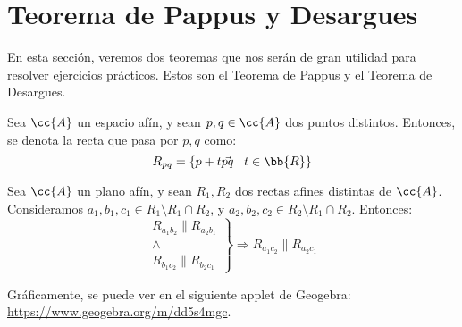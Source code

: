 \section{Teorema de Pappus y Desargues}
En esta sección, veremos dos teoremas que nos serán de gran utilidad para resolver ejercicios prácticos. Estos son el Teorema de Pappus y el Teorema de Desargues.

\begin{notacion}
    Sea $\cc{A}$ un espacio afín, y sean $p,q\in \cc{A}$ dos puntos distintos. Entonces, se denota la recta que pasa por $p,q$ como:
    \begin{equation*}
        R_{pq} = \{p+t\vec{pq}\mid t\in \bb{R}\}
    \end{equation*}
\end{notacion}
\begin{teo}[de Pappus]
    Sea $\cc{A}$ un plano afín, y sean $R_1, R_2$ dos rectas afines distintas de $\cc{A}$.
    Consideramos $a_1,b_1,c_1\in R_1\setminus R_1\cap R_2$, y $a_2,b_2,c_2\in R_2\setminus R_1\cap R_2$. Entonces:
    \begin{equation*}
        \left.
            \begin{array}{c}
                R_{a_1b_2} \| R_{a_2b_1} \\ \land \\ R_{b_1c_2} \| R_{b_2c_1}
            \end{array} 
        \right\} \Longrightarrow R_{a_1c_2} \| R_{a_2c_1}
    \end{equation*}

    Gráficamente, se puede ver en el siguiente applet de Geogebra: \href{https://www.geogebra.org/m/dd5s4mgc}{https://www.geogebra.org/m/dd5s4mgc}.
\end{teo}
